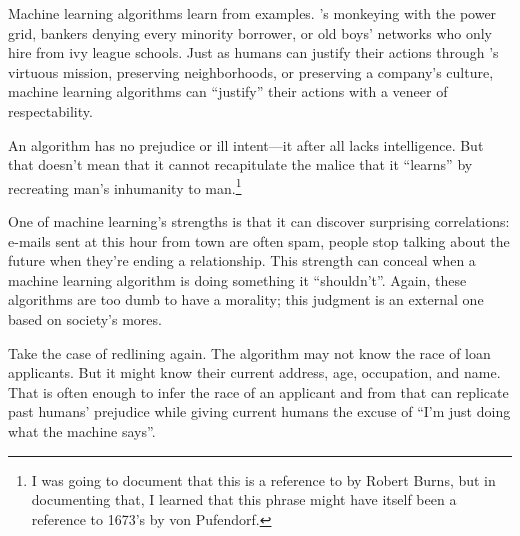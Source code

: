 
Machine learning algorithms learn from examples.  \energyJerk{}'s
monkeying with the power grid, bankers denying every minority
borrower, or old boys' networks who only hire from ivy league
schools.  Just as humans can justify their actions through
\energyCompany{}'s virtuous mission, preserving neighborhoods, or
preserving a company's culture, machine learning algorithms can
``justify'' their actions with a veneer of respectability.

An algorithm has no prejudice or ill intent---it after all lacks
intelligence.  But that doesn't mean that it cannot recapitulate the
malice that it ``learns'' by recreating man's inhumanity to
man.\footnote{I was going to document that this is a reference to
   by Robert Burns, but in documenting that, I learned
  that this phrase might have itself been a reference to 1673's
   by von
  Pufendorf.}

One of machine learning's strengths is that it can discover surprising
correlations: e-mails sent at this hour from town are often spam,
people stop talking about the future when they're ending a
relationship.  This strength can conceal when a machine learning
algorithm is doing something it ``shouldn't''. Again, these
  algorithms are too dumb to have a morality; this judgment is an
  external one based on society's mores.

Take the case of redlining again.  The algorithm may not know the race
of loan applicants.  But it might know their current address, age,
occupation, and name.  That is often enough to infer the race of an
applicant and from that can replicate past humans' prejudice while
giving current humans the excuse of ``I'm just doing what the machine
says''.



